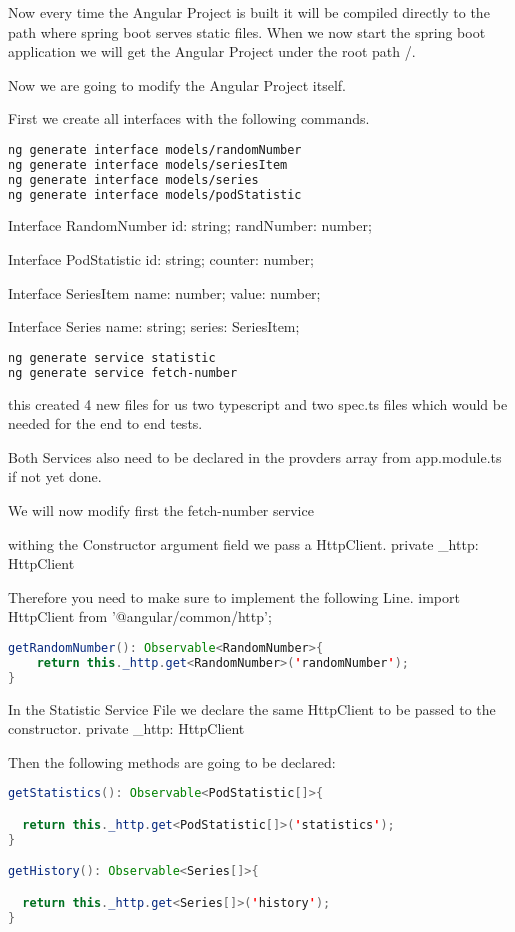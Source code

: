 Now every time the Angular Project is built it will be compiled directly to the path where spring boot serves static files.
When we now start the spring boot application we will get the Angular Project under the root path /.

Now we are going to modify the Angular Project itself.

First we create all interfaces with the following commands.
\begin{lstlisting}[language=Bash]
ng generate interface models/randomNumber
ng generate interface models/seriesItem
ng generate interface models/series
ng generate interface models/podStatistic
\end{lstlisting}

Interface RandomNumber
id: string;
randNumber: number;

Interface PodStatistic
id: string;
counter: number;

Interface SeriesItem
name: number;
value: number;

Interface Series
name: string;
series: SeriesItem;


\begin{lstlisting}[language=Bash]
ng generate service statistic
ng generate service fetch-number
\end{lstlisting}
this created 4 new files for us two typescript and two spec.ts files which would be needed for the end to end tests.

Both Services also need to be declared in the provders array from app.module.ts if not yet done.

We will now modify first the fetch-number service

withing the Constructor argument field we pass a HttpClient.
private _http: HttpClient

Therefore you need to make sure to implement the following Line.
import { HttpClient } from '@angular/common/http';

\begin{lstlisting}[language=Java]
getRandomNumber(): Observable<RandomNumber>{
    return this._http.get<RandomNumber>('randomNumber');
}
\end{lstlisting}

In the Statistic Service File we declare the same HttpClient to be passed to the constructor.
private _http: HttpClient

Then the following methods are going to be declared:
\begin{lstlisting}[language=Java]
getStatistics(): Observable<PodStatistic[]>{

  return this._http.get<PodStatistic[]>('statistics');
}

getHistory(): Observable<Series[]>{

  return this._http.get<Series[]>('history');
}
\end{lstlisting}

